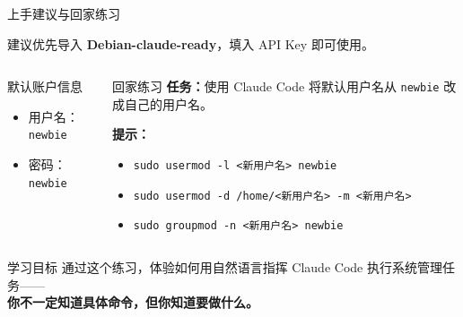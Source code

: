 \documentclass[aspectratio=169]{ctexbeamer}
\begin{document}
\begin{frame}{上手建议与回家练习}
\small

建议优先导入 \textbf{Debian-claude-ready}，填入 API Key 即可使用。

\vspace{0.1cm}

\begin{columns}[T]
\begin{block}{默认账户信息}
\begin{itemize}
  \setlength\itemsep{2pt}
  \item 用户名：\texttt{newbie}
  \item 密码：\texttt{newbie}
\end{itemize}
\end{block}

\begin{exampleblock}{回家练习}
\textbf{任务：}使用 Claude Code 将默认用户名从 \texttt{newbie} 改成自己的用户名。

\vspace{4pt}
\textbf{提示：}
\begin{itemize}
  \setlength\itemsep{0pt}
  \item \texttt{sudo usermod -l <新用户名> newbie}
  \item \texttt{sudo usermod -d /home/<新用户名> -m <新用户名>}
  \item \texttt{sudo groupmod -n <新用户名> newbie}
\end{itemize}
\end{exampleblock}
\end{columns}

\vspace{0.15cm}

\begin{alertblock}{学习目标}
  通过这个练习，体验如何用自然语言指挥 Claude Code 执行系统管理任务——\\
  \textbf{你不一定知道具体命令，但你知道要做什么。}
\end{alertblock}

\end{frame}
\end{document}
